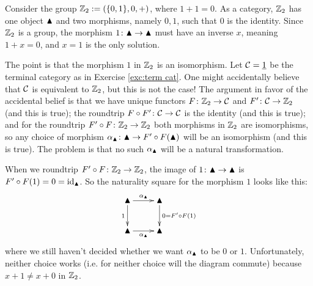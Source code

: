 \documentclass[CT4S-EN-RU]{subfiles}
\begin{document}
\begin{example}\label{ex:Z1 not equiv Z2}

Consider the group ${\mathbb Z}_2:=(\{0,1\},0,+)$, where $1+1=0$. As a category, ${\mathbb Z}_2$ has one object $\blacktriangle$ and two morphisms, namely $0,1$, such that $0$ is the identity. Since ${\mathbb Z}_2$ is a group, the morphism $1\colon\blacktriangle\rightarrow\blacktriangle$ must have an inverse $x$, meaning $1+x=0$, and $x=1$ is the only solution.

The point is that the morphism $1$ in ${\mathbb Z}_2$ is an isomorphism. Let $\mathcal{C}=\underline{1}$ be the terminal category as in Exercise \ref{exc:term cat}. One might accidentally believe that $\mathcal{C}$ is equivalent to ${\mathbb Z}_2$, but this is not the case! The argument in favor of the accidental belief is that we have unique functors $F\colon{\mathbb Z}_2\rightarrow\mathcal{C}$ and $F'\colon\mathcal{C}\rightarrow{\mathbb Z}_2$ (and this is true); the roundtrip $F\circ F'\colon\mathcal{C}\rightarrow\mathcal{C}$ is the identity (and this is true); and for the roundtrip $F'\circ F\colon{\mathbb Z}_2\rightarrow{\mathbb Z}_2$ both morphisms in ${\mathbb Z}_2$ are isomorphisms, so any choice of morphism $\alpha_\blacktriangle\colon\blacktriangle\rightarrow F'\circ F(\blacktriangle)$ will be an isomorphism (and this is true). The problem is that no such $\alpha_\blacktriangle$ will be a natural transformation.

When we roundtrip $F'\circ F\colon{\mathbb Z}_2\rightarrow{\mathbb Z}_2$, the image of $1\colon\blacktriangle\rightarrow\blacktriangle$ is $F'\circ F(1)=0=\textnormal{id}_{\blacktriangle}$. So the naturality square for the morphism $1$ looks like this:
$$
\xymatrix{\monOb\ar[r]^{\alpha_\monOb}\ar[d]_{1}&\monOb\ar[d]^{0=F'\circ F(1)}\\\monOb\ar[r]_{\alpha_\monOb}&\monOb}
$$
where we still haven't decided whether we want $\alpha_\blacktriangle$ to be $0$ or $1$. Unfortunately, neither choice works (i.e. for neither choice will the diagram commute) because $x+1\neq x+0$ in ${\mathbb Z}_2$.

\end{example}
\end{document}
